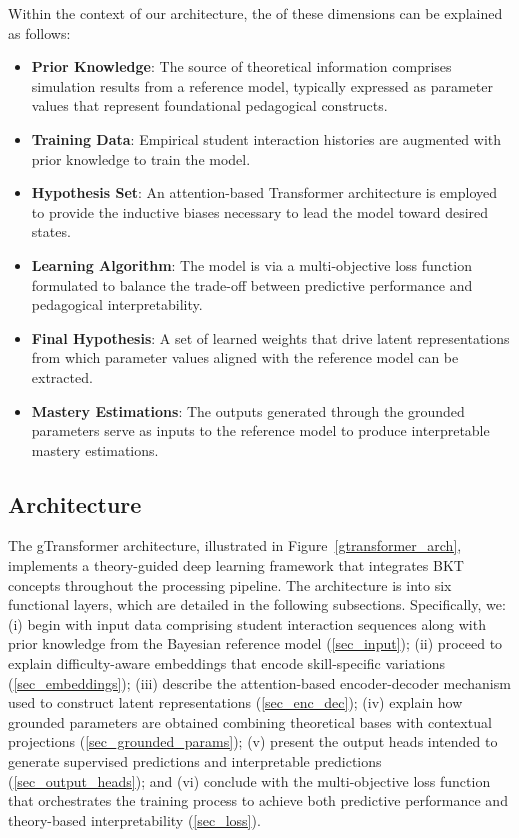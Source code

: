 \documentclass[applsci,article,submit,moreauthors,pdftex]{Definitions/mdpi}
\begin{document}
Within the context of our architecture, the  of these dimensions can be explained as follows: 

\begin{itemize}
    \item \textbf{Prior Knowledge}: The source of theoretical information comprises simulation results from a reference model, typically expressed as parameter values that represent foundational pedagogical constructs.
    \item \textbf{Training Data}: Empirical student interaction histories are augmented with prior knowledge to train the model.
    \item \textbf{Hypothesis Set}: An attention-based Transformer architecture is employed to provide the inductive biases necessary to lead the model toward desired states.
    \item \textbf{Learning Algorithm}: The model is  via a multi-objective loss function formulated to balance the trade-off between predictive performance and pedagogical interpretability.
    \item \textbf{Final Hypothesis}: A set of learned weights that drive latent representations from which parameter values aligned with the reference model can be extracted.
    \item \textbf{Mastery Estimations}: The outputs generated through the grounded parameters serve as inputs to the reference model to produce interpretable mastery estimations.
\end{itemize}


\subsection{Architecture}

The gTransformer architecture, illustrated in Figure~\ref{gtransformer_arch}, implements a theory-guided deep learning framework that integrates BKT concepts throughout the processing pipeline. The architecture is  into six functional layers, which are detailed in the following subsections. Specifically, we: (i) begin with input data comprising student interaction sequences along with prior knowledge from the Bayesian reference model (\cref{sec_input}); (ii) proceed to explain difficulty-aware embeddings that encode skill-specific variations (\cref{sec_embeddings}); (iii) describe the attention-based encoder-decoder mechanism used to construct  latent representations (\cref{sec_enc_dec}); (iv) explain how grounded parameters are obtained combining theoretical bases with contextual projections (\cref{sec_grounded_params}); (v) present the output heads intended to generate supervised predictions and interpretable predictions (\cref{sec_output_heads}); and (vi) conclude with the multi-objective loss function that orchestrates the training process to achieve both predictive performance and theory-based interpretability (\cref{sec_loss}).
\end{document}
